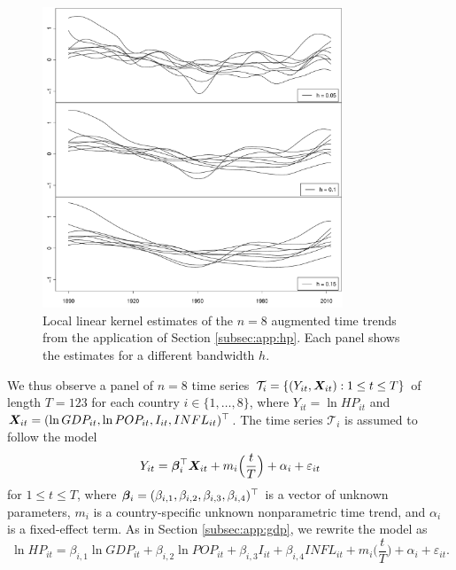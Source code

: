 \documentclass[a4paper,12pt]{article}
\makeatletter
\renewcommand{\eqref}[1]{\tagform@{\ref{#1}}}
\makeatother
\begin{document}
\begin{figure}[t!]
\centering
\includegraphics[width=0.8\textwidth]{output/plots/hp/smoothed_hp_data_augmented.pdf}
\vspace{0.2cm}
\caption{Local linear kernel estimates of the $n=8$ augmented time trends from the application of Section \ref{subsec:app:hp}. Each panel shows the estimates for a different bandwidth $h$.}\label{fig:app:hp_augm}
\end{figure}


We thus observe a panel of $n = 8$ time series $\mathcal{T}_i = \{(Y_{it}, \boldsymbol{X}_{it}): 1 \le t \le T \}$ of length \linebreak$T = 123$ for each country $i \in \{1,\ldots, 8\}$, where $Y_{it} = \ln HP_{it}$ and $\X_{it} = (\ln GDP_{it}, \linebreak \ln POP_{it}, I_{it}, INFL_{it})^\top$. The time series $\mathcal{T}_i$ is assumed to follow the model 
\begin{equation}\label{eq:model:app3}
Y_{it} = \bm{\beta}^\top_i \boldsymbol{X}_{it} + m_i \Big( \frac{t}{T} \Big) + \alpha_i + \varepsilon_{it} 
\end{equation}
for $1 \le t \le T$, where $\bm{\beta}_i = (\beta_{i, 1}, \beta_{i, 2}, \beta_{i, 3}, \beta_{i, 4})^\top$ is a vector of unknown parameters, $m_i$ is a country-specific unknown nonparametric time trend, and $\alpha_i$ is a fixed-effect term. As in Section \ref{subsec:app:gdp}, we rewrite the model \eqref{eq:model:app3} as
\begin{equation}\label{eq:model:app4}
\ln HP_{it} = \beta_{i, 1} \ln GDP_{it} + \beta_{i, 2} \ln POP_{it} + \beta_{i, 3} I_{it} + \beta_{i, 4} INFL_{it} + m_i \Big( \frac{t}{T} \Big) + \alpha_i + \varepsilon_{it}.
\end{equation}
\end{document}
